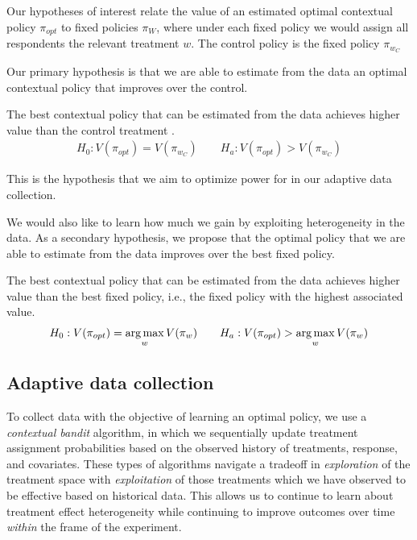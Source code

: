 \documentclass[letterpaper, 12pt, parskip=full,]{scrartcl}
\begin{document}
Our hypotheses of interest relate the value of an estimated optimal contextual policy $\pi_{opt}$ to fixed policies $\pi_{W}$, where under each fixed policy we would assign all respondents the relevant treatment $w$. The control policy is the fixed policy $\pi_{w_{C}}$

Our primary hypothesis is that we are able to estimate from the data an optimal contextual policy that improves over the control. 
  \begin{hypothesis}
  The best contextual policy that can be estimated from the data achieves higher value than the control treatment \label{eq:optctr}.
\begin{align}
  H_{0}: V(\pi_{opt}) = V(\pi_{w_{C}}) \qquad H_{a}:  V(\pi_{opt}) > V(\pi_{w_{C}})
\end{align}
\end{hypothesis}
This is the hypothesis that we aim to optimize power for in our adaptive data collection. 

We would also like to learn how much we gain by exploiting heterogeneity in the data. As a secondary hypothesis, we propose that the optimal policy that we are able to estimate from the data improves over the best fixed policy. 
  \begin{hypothesis}
  The best contextual policy that can be estimated from the data achieves higher value than the best fixed policy, i.e., the fixed policy with the highest associated value. 
  \label{eq:optmax}
\begin{align}
  H_{0}: V(\pi_{opt}) = \operatorname*{arg\,max}_w V(\pi_{w}) \qquad H_{a}:  V(\pi_{opt}) > \operatorname*{arg\,max}_w V(\pi_{w})
\end{align}
\end{hypothesis}


\subsection{Adaptive data collection}\label{adaptiveagent}

To collect data with the objective of learning an optimal policy, we use a \textit{contextual bandit} algorithm, in which we sequentially update treatment assignment probabilities based on the observed history of treatments, response, and covariates. These types of algorithms navigate a tradeoff in \textit{exploration} of the treatment space with \textit{exploitation} of those treatments which we have observed to be effective based on historical data. This allows us to continue to learn about treatment effect heterogeneity while continuing to improve outcomes over time \textit{within} the frame of the experiment. 
\end{document}
